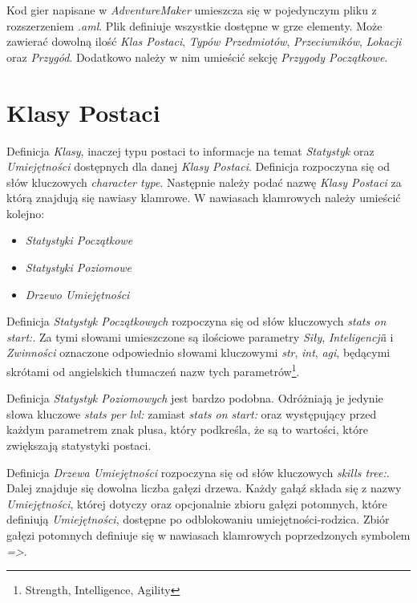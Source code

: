 \documentclass[openright]{xmgr}
\begin{document}
Kod gier napisane w \textit{AdventureMaker} umieszcza się w pojedynczym pliku z rozszerzeniem \textit{.aml}. Plik definiuje wszystkie dostępne w grze elementy. Może zawierać dowolną ilość \textit{Klas Postaci}, \textit{Typów Przedmiotów}, \textit{Przeciwników}, \textit{Lokacji} oraz \textit{Przygód}. Dodatkowo należy w nim umieścić sekcję \textit{Przygody Początkowe}. 

\section{Klasy Postaci}
Definicja \textit{Klasy}, inaczej typu postaci to informacje na temat \textit{Statystyk} oraz \textit{Umiejętności} dostępnych dla danej \textit{Klasy Postaci}. Definicja rozpoczyna się od słów kluczowych \textit{character type}. Następnie należy podać nazwę \textit{Klasy Postaci} za którą znajdują się nawiasy klamrowe. W nawiasach klamrowych należy umieścić kolejno:
\begin{itemize}
	\item \textit{Statystyki Początkowe}
	\item \textit{Statystyki Poziomowe}
	\item \textit{Drzewo Umiejętności}
\end{itemize}

Definicja \textit{Statystyk Początkowych} rozpoczyna się od słów kluczowych \textit{stats on start:}. Za tymi słowami umieszczone są ilościowe parametry \textit{Siły}, \textit{Inteligencji}i i \textit{Zwinności} oznaczone odpowiednio słowami kluczowymi \textit{str}, \textit{int}, \textit{agi}, będącymi skrótami od angielskich tłumaczeń nazw tych parametrów\footnote{Strength, Intelligence, Agility}.

Definicja \textit{Statystyk Poziomowych} jest bardzo podobna. Odróżniają je jedynie słowa kluczowe \textit{stats per lvl:} zamiast  \textit{stats on start:} oraz występujący przed każdym parametrem znak plusa, który podkreśla, że są to wartości, które zwiększają statystyki postaci. 

Definicja \textit{Drzewa Umiejętności} rozpoczyna się od słów kluczowych \textit{skills tree:}. Dalej znajduje się dowolna liczba gałęzi drzewa.
Każdy gałąź składa się z nazwy \textit{Umiejętności}, której dotyczy oraz opcjonalnie zbioru gałęzi potomnych, które definiują \textit{Umiejętności}, dostępne po odblokowaniu umiejętności-rodzica.
Zbiór gałęzi potomnych definiuje się w nawiasach klamrowych poprzedzonych symbolem \textit{=>}. 
\end{document}
